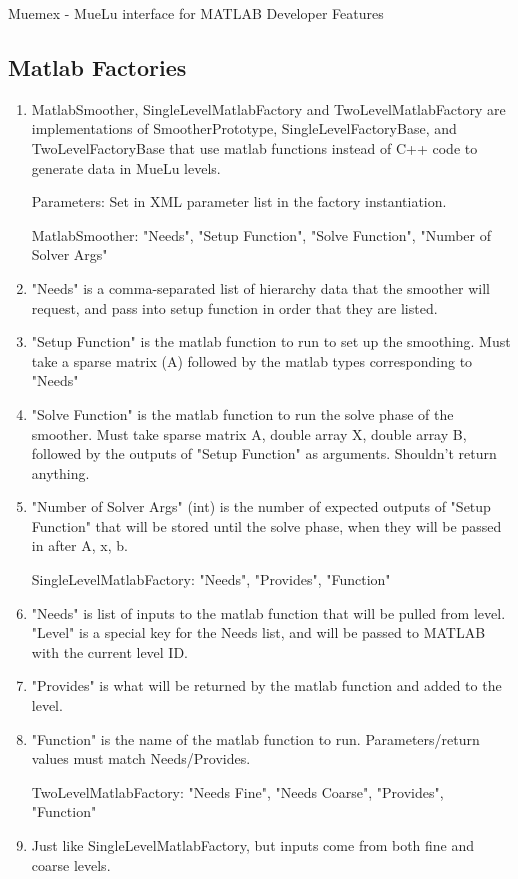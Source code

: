 Muemex - MueLu interface for MATLAB
Developer Features

\subsection{Matlab Factories}

\begin{enumerate}
  \item MatlabSmoother, SingleLevelMatlabFactory and TwoLevelMatlabFactory are
implementations of SmootherPrototype, SingleLevelFactoryBase, and
TwoLevelFactoryBase that use matlab functions instead of C++ code
to generate data in MueLu levels.

Parameters: Set in XML parameter list in the factory instantiation.

MatlabSmoother: "Needs", "Setup Function", "Solve Function", "Number of Solver
Args"
  \item "Needs" is a comma-separated list of hierarchy data that the smoother will
request, and pass into setup function in order that they are listed.
  \item "Setup Function" is the matlab function to run to set up the smoothing. Must
take a sparse matrix (A) followed by the matlab types corresponding to "Needs"
  \item "Solve Function" is the matlab function to run the solve phase of the
smoother. Must take sparse matrix A, double array X, double array B, followed by
the outputs of "Setup Function" as arguments. Shouldn't return anything.
  \item "Number of Solver Args" (int) is the number of expected outputs of "Setup
Function" that will be stored until the solve phase, when they will be
passed in after A, x, b.

SingleLevelMatlabFactory: "Needs", "Provides", "Function"
  \item "Needs" is list of inputs to the matlab function that will be pulled from
level. "Level" is a special key for the Needs list, and will be passed to MATLAB with the
current level ID.
  \item "Provides" is what will be returned by the matlab function and added to the
level.
  \item "Function" is the name of the matlab function to run. Parameters/return
values must match Needs/Provides.

TwoLevelMatlabFactory: "Needs Fine", "Needs Coarse", "Provides", "Function"
  \item Just like SingleLevelMatlabFactory, but inputs come from both fine and coarse
levels.
\end{enumerate}

